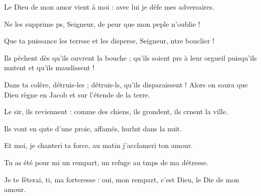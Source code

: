 \item Le Dieu de mon amor vient à moi :\psstar{} avec lui je défe mes adversaires.
\item Ne les supprime ps, Seigneur,\psstar{} de peur que mon peple n’oublie ! 
\item Que ta puissance les terrsse et les disperse,\psstar{} Seigneur, ntre bouclier !
\item Ils pèchent dès qu’ils ouvrent la bouche ;\pscross{} qu’ils soient prs à leur orgueil\psstar{} puisqu’ils mntent et qu’ils maudissent !
\item Dans ta colère, détruis-les ;\pscross{} détruis-ls, qu’ils disparaissent !\psstar{} Alors on saura que Dieu règne en Jacob et sur l’étende de la terre.
\item Le sir, ils reviennent :\psstar{} comme des chiens, ils grondent, ils crnent la ville.
\item Ils vont en qute d’une proie,\psstar{} affamés, hurlnt dans la nuit.
\item Et moi, je chanteri ta force,\psstar{} au matin j’acclameri ton amour. 
\item Tu as été pour mi un rempart,\psstar{} un refuge au tmps de ma détresse.
\item Je te fêterai, ti, ma forteresse :\psstar{} oui, mon rempart, c’est Dieu, le Die de mon amour.